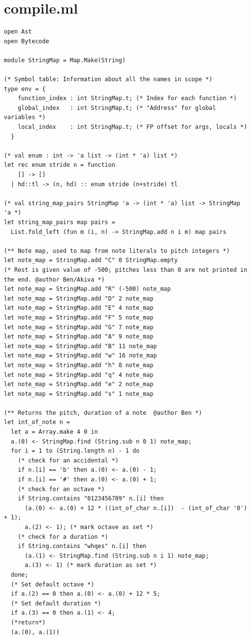 \documentclass[12pt,A4]{book}
\begin{document}
\section{compile.ml}
\begin{verbatim}
open Ast
open Bytecode

module StringMap = Map.Make(String)

(* Symbol table: Information about all the names in scope *)
type env = {
    function_index : int StringMap.t; (* Index for each function *)
    global_index   : int StringMap.t; (* "Address" for global variables *)
    local_index    : int StringMap.t; (* FP offset for args, locals *)
  }

(* val enum : int -> 'a list -> (int * 'a) list *)
let rec enum stride n = function
    [] -> []
  | hd::tl -> (n, hd) :: enum stride (n+stride) tl

(* val string_map_pairs StringMap 'a -> (int * 'a) list -> StringMap 'a *)
let string_map_pairs map pairs =
  List.fold_left (fun m (i, n) -> StringMap.add n i m) map pairs

(** Note map, used to map from note literals to pitch integers *)
let note_map = StringMap.add "C" 0 StringMap.empty
(* Rest is given value of -500; pitches less than 0 are not printed in the end. @author Ben/Akiva *)
let note_map = StringMap.add "R" (-500) note_map
let note_map = StringMap.add "D" 2 note_map
let note_map = StringMap.add "E" 4 note_map
let note_map = StringMap.add "F" 5 note_map
let note_map = StringMap.add "G" 7 note_map
let note_map = StringMap.add "A" 9 note_map
let note_map = StringMap.add "B" 11 note_map
let note_map = StringMap.add "w" 16 note_map
let note_map = StringMap.add "h" 8 note_map
let note_map = StringMap.add "q" 4 note_map
let note_map = StringMap.add "e" 2 note_map
let note_map = StringMap.add "s" 1 note_map

(** Returns the pitch, duration of a note  @author Ben *)
let int_of_note n =
  let a = Array.make 4 0 in
  a.(0) <- StringMap.find (String.sub n 0 1) note_map;
  for i = 1 to (String.length n) - 1 do
    (* check for an accidental *)
    if n.[i] == 'b' then a.(0) <- a.(0) - 1;
    if n.[i] == '#' then a.(0) <- a.(0) + 1;
    (* check for an octave *)
    if String.contains "0123456789" n.[i] then
      (a.(0) <- a.(0) + 12 * ((int_of_char n.[i])  - (int_of_char '0') + 1);
      a.(2) <- 1); (* mark octave as set *)
    (* check for a duration *)
    if String.contains "whqes" n.[i] then
      (a.(1) <- StringMap.find (String.sub n i 1) note_map;
      a.(3) <- 1) (* mark duration as set *)
  done;
  (* Set default octave *)
  if a.(2) == 0 then a.(0) <- a.(0) + 12 * 5;
  (* Set default duration *)
  if a.(3) == 0 then a.(1) <- 4;
  (*return*)
  (a.(0), a.(1))
  


\end{verbatim}
\end{document}
